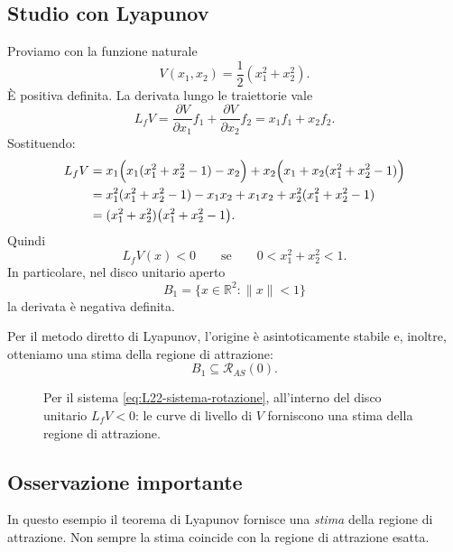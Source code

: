 \subsection{Studio con Lyapunov}

Proviamo con la funzione naturale
\[
V(x_1,x_2)=\frac{1}{2}(x_1^2+x_2^2).
\]
È positiva definita. La derivata lungo le traiettorie vale
\[
L_fV
=
\frac{\partial V}{\partial x_1}f_1+\frac{\partial V}{\partial x_2}f_2
=
x_1f_1+x_2f_2.
\]
Sostituendo:
\begin{align*}
L_fV
&=
x_1\Bigl(x_1(x_1^2+x_2^2-1)-x_2\Bigr)
+
x_2\Bigl(x_1+x_2(x_1^2+x_2^2-1)\Bigr)\\
&=
x_1^2(x_1^2+x_2^2-1)-x_1x_2+x_1x_2+x_2^2(x_1^2+x_2^2-1)\\
&=
(x_1^2+x_2^2)\bigl(x_1^2+x_2^2-1\bigr).
\end{align*}
Quindi
\[
L_fV(x)<0
\qquad \text{se} \qquad
0<x_1^2+x_2^2<1.
\]
In particolare, nel disco unitario aperto
\[
B_1=\{x\in\mathbb{R}^2:\|x\|<1\}
\]
la derivata è negativa definita.

Per il metodo diretto di Lyapunov, l'origine è asintoticamente stabile e, inoltre, otteniamo una stima della regione di attrazione:
\[
B_1 \subseteq \mathcal{R}_{AS}(0).
\]

\begin{figure}[h!]
\centering
{}
\caption{Per il sistema \eqref{eq:L22-sistema-rotazione}, all'interno del disco unitario \(L_fV<0\): le curve di livello di \(V\) forniscono una stima della regione di attrazione.}
\end{figure}

\subsection{Osservazione importante}

In questo esempio il teorema di Lyapunov fornisce una \emph{stima} della regione di attrazione.  
Non sempre la stima coincide con la regione di attrazione esatta.

